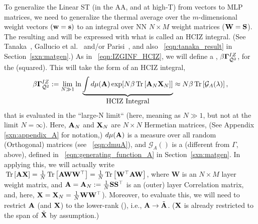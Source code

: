 To generalize the Linear ST \Perceptron (in the AA, and at high-T) from \Perceptron vectors to MLP matrices,
we need to generalize the thermal average over the $m$-dimensional \Perceptron weight vectors $({\mathbf{w}}={\mathbf{s}})$
to an integral over NN \Student $N \times M$ weight matrices (${\mathbf{W}}=\mathbf{S}$).
The resulting \PartitionFunction and \FreeEnergy will be expressed with what is called an HCIZ integral.
(See Tanaka~\cite{Tanaka2007, Tanaka2008}, Gallucio et al.~\cite{Bouchaud1998} and/or Parisi~\cite{PP95}, and also \EQN~\ref{eqn:tanaka_result} in Section~\ref{sxn:matgen}.)
As in \EQN~\ref{eqn:IZGINF_HCIZ}, we will define a \emph{\LayerQuality \GeneratingFunction}, $\beta\mathbf{\Gamma}^{IZ}_{\bar{\mathcal{Q}}^{2}}$, for the \LayerQuality (squared).
This will take the form of an HCIZ integral,
\begin{align}
\label{eqn:hciz_prelim}
\beta\mathbf{\Gamma}^{IZ}_{\bar{\mathcal{Q}}^{2}} := \lim_{N\gg 1}\ln \underbrace{\int d\mu(\mathbf{A}) \exp[N\beta\mbox{}\operatorname{Tr}\left[\mathbf{A}_N\mathbf{X}_N\right]] }_{\mbox{HCIZ Integral}} 
  \approx N\beta\mbox{}\operatorname{Tr}\left[\mathcal{G}_{A}(\lambda)\right]  ,
\end{align}
that is evaluated in the ``large-N limit`` (here, meaning as $N \gg 1$, but not at the limit $N=\infty$).
Here,  $\mathbf{A}_N$ and $\mathbf{X}_N$ are $N \times N$ Hermetian matrices, (See Appendix \ref{sxn:appendix_A} for notation,) $d\mu(\mathbf{A})$ is a measure
over all random (Orthogonal) matrices (see \EQN~\ref{eqn:dmuA}),
and $\mathcal{G}_{A}()$ is a \red{\GEN} 
(different from $\Gamma$, above), defined in \EQN~\ref{eqn:generating_function_A} in Section~\ref{sxn:matgen}. 
In applying this, we will actually write $\mbox{}\operatorname{Tr}\left[\mathbf{A}\mathbf{X}\right]=\tfrac{1}{N}\mbox{}\operatorname{Tr}\left[\mathbf{A}{\mathbf{W}}{\mathbf{W}}^{\top}\right]=\tfrac{1}{N}\mbox{}\operatorname{Tr}\left[{\mathbf{W}}^{\top}\mathbf{A}{\mathbf{W}}\right]$,
where $\mathbf{W}$ is an $N \times M$ layer weight matrix, and $\mathbf{A}=\mathbf{A}_N:=\tfrac{1}{N}{\mathbf{S}}{\mathbf{S}}^{\top}$ is an (outer) layer
Correlation matrix, and, here,  $\mathbf{X}=\mathbf{X}_N=\tfrac{1}{N}{\mathbf{W}}{\mathbf{W}}^{\top}$).
Moreover, to evaluate this, we will need to restrict $\mathbf{A}$ (and $\mathbf{X}$)
to the lower-rank \EffectiveCorrelationSpace (\ECS),  i.e., $\mathbf{A}\rightarrow\tilde{\mathbf{A}}$. ($\mathbf{X}$ is already restricted to the span of $\tilde{\mathbf{X}}$ by \ECS assumption.)

